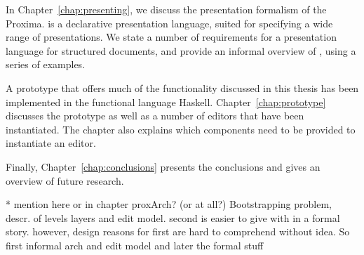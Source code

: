 In Chapter~\ref{chap:presenting}, we discuss the {\Xprez} presentation formalism of the Proxima. {\Xprez} is a declarative presentation language, suited for specifying a wide range of presentations. We state a number of requirements for a presentation language for structured documents, and provide an informal overview of {\Xprez}, using a series of examples.

A prototype that offers much of the functionality discussed in this thesis has been implemented in the functional language Haskell. Chapter~\ref{chap:prototype} discusses the prototype as well as a number of editors that have been instantiated. The chapter also explains which components need to be provided to instantiate an editor.

Finally, Chapter~\ref{chap:conclusions} presents the conclusions and gives an overview of future research.


\bc
* mention here or in chapter proxArch? (or at all?)
Bootstrapping problem, descr. of levels layers and edit model. second is easier to give with in a formal story. however, design reasons for first are hard to comprehend without idea. So first informal arch and edit model and later the formal stuff

\ec